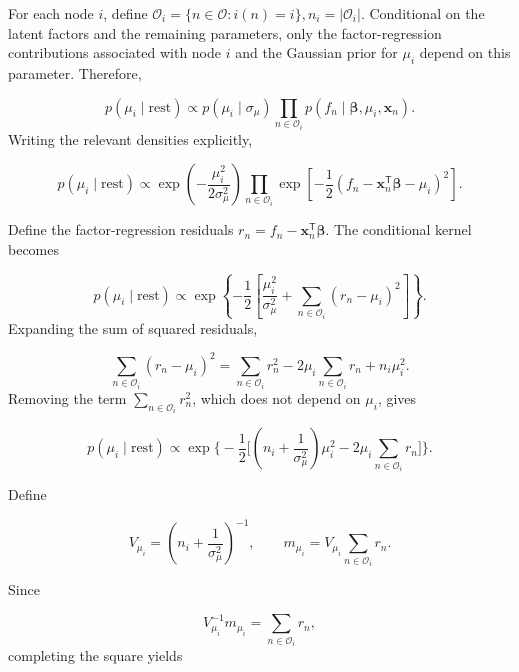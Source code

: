 \documentclass[pdftex,12pt,openright,a4paper,oneside]{book}
\begin{document}
For each node $i$, define $\mathcal{O}_i
=\{n\in\mathcal{O}:i(n)=i\},
n_i=|\mathcal{O}_i|$.
Conditional on the latent factors and
the remaining parameters, only the
factor-regression contributions associated
with node $i$ and the Gaussian prior
for $\mu_i$ depend on this parameter.
Therefore,

\begin{equation*}
p(\mu_i\mid\mathrm{rest})
\propto
p(\mu_i\mid\sigma_\mu)
\prod_{n\in\mathcal{O}_i}
p(f_n\mid
\boldsymbol{\beta},\mu_i,\mathbf{x}_n).
\end{equation*}
Writing the relevant densities explicitly,

\begin{equation*}
p(\mu_i\mid\mathrm{rest})
\propto
\exp\left(
-\frac{\mu_i^2}{2\sigma_\mu^2}
\right)
\prod_{n\in\mathcal{O}_i}
\exp\left[
-\frac12
\left(
f_n-\mathbf{x}_n^{\mathsf T}
\boldsymbol{\beta}-\mu_i
\right)^2
\right].
\end{equation*}

Define the factor-regression residuals $r_n=
f_n-\mathbf{x}_n^{\mathsf T}
\boldsymbol{\beta}$.
The conditional kernel becomes

\begin{equation*}
p(\mu_i\mid\mathrm{rest})
\propto
\exp\left\{
-\frac12
\left[
\frac{\mu_i^2}{\sigma_\mu^2}
+
\sum_{n\in\mathcal{O}_i}
(r_n-\mu_i)^2
\right]
\right\}.
\end{equation*}
Expanding the sum of squared residuals,

\begin{equation*}
\sum_{n\in\mathcal{O}_i}
(r_n-\mu_i)^2=
\sum_{n\in\mathcal{O}_i}r_n^2-2\mu_i
\sum_{n\in\mathcal{O}_i}r_n
+n_i\mu_i^2.
\end{equation*}
Removing the term
$\sum_{n\in\mathcal{O}_i}r_n^2$,
which does not depend on $\mu_i$, gives

\begin{equation*}
p(\mu_i\mid\mathrm{rest})
\propto
\exp\Bigg\{-\frac12\Bigg[
\left(
n_i+\frac{1}{\sigma_\mu^2}
\right)\mu_i^2
-2\mu_i
\sum_{n\in\mathcal{O}_i}r_n
\Bigg]\Bigg\}.
\end{equation*}

Define

\begin{equation*}
V_{\mu_i}
=
\left(
n_i+\frac{1}{\sigma_\mu^2}
\right)^{-1},
\qquad
m_{\mu_i}
=
V_{\mu_i}
\sum_{n\in\mathcal{O}_i}r_n.
\end{equation*}

Since

\begin{equation*}
V_{\mu_i}^{-1}m_{\mu_i}
=
\sum_{n\in\mathcal{O}_i}r_n,
\end{equation*}
completing the square yields
\end{document}

